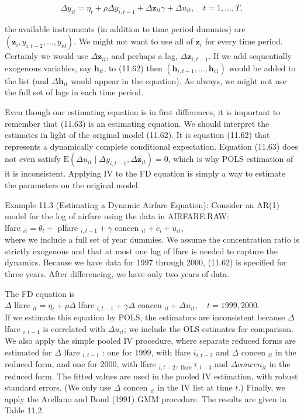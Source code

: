 \documentclass[10pt]{article}
\begin{document}
\begin{equation*}
\Delta y_{i t}=\eta_{t}+\rho \Delta y_{i, t-1}+\Delta \mathbf{z}_{i t} \gamma+\Delta u_{i t}, \quad t=1, \ldots, T, \tag{11.63}
\end{equation*}


the available instruments (in addition to time period dummies) are $\left(\mathbf{z}_{i}, y_{i, t-2}, \ldots, y_{i 0}\right)$. We might not want to use all of $\mathbf{z}_{i}$ for every time period. Certainly we would use $\Delta \mathbf{z}_{i t}$, and perhaps a lag, $\Delta \mathbf{z}_{i, t-1}$. If we add sequentially exogenous variables, say $\mathbf{h}_{i t}$, to (11.62) then $\left(\mathbf{h}_{i, t-1}, \ldots, \mathbf{h}_{i 1}\right)$ would be added to the list (and $\Delta \mathbf{h}_{i t}$ would appear in the equation). As always, we might not use the full set of lags in each time period.

Even though our estimating equation is in first differences, it is important to remember that (11.63) is an estimating equation. We should interpret the estimates in light of the original model (11.62). It is equation (11.62) that represents a dynamically complete conditional expectation. Equation (11.63) does not even satisfy $\mathrm{E}\left(\Delta u_{i t} \mid \Delta y_{i, t-1}, \Delta \mathbf{z}_{i t}\right)=0$, which is why POLS estimation of it is inconsistent. Applying IV to the FD equation is simply a way to estimate the parameters on the original model.

Example 11.3 (Estimating a Dynamic Airfare Equation): Consider an AR(1) model for the log of airfare using the data in AIRFARE.RAW:\\
lfare $_{i t}=\theta_{t}+$ plfare $_{i, t-1}+\gamma$ concen $_{i t}+c_{i}+u_{i t}$,\\
where we include a full set of year dummies. We assume the concentration ratio is strictly exogenous and that at most one lag of lfare is needed to capture the dynamics. Because we have data for 1997 through 2000, (11.62) is specified for three years. After differencing, we have only two years of data.

The FD equation is\\
$\Delta$ lfare $_{i t}=\eta_{t}+\rho \Delta$ lfare $_{i, t-1}+\gamma \Delta$ concen $_{i t}+\Delta u_{i t}, \quad t=1999,2000$.\\
If we estimate this equation by POLS, the estimators are inconsistent because $\Delta$ lfare $_{i, t-1}$ is correlated with $\Delta u_{i t}$; we include the OLS estimates for comparison. We also apply the simple pooled IV procedure, where separate reduced forms are estimated for $\Delta$ lfare $_{i, t-1}$ : one for 1999, with lfare $i_{i, t-2}$ and $\Delta$ concen $_{i t}$ in the reduced form, and one for 2000, with lfare $_{i, t-2}$, $_{\text {lfare }} i_{, t-3}$ and $\Delta c o n c e n_{i t}$ in the reduced form. The fitted values are used in the pooled IV estimation, with robust standard errors. (We only use $\Delta$ concen $_{i t}$ in the IV list at time $t$.) Finally, we apply the Arellano and Bond (1991) GMM procedure. The results are given in Table 11.2.
\end{document}
